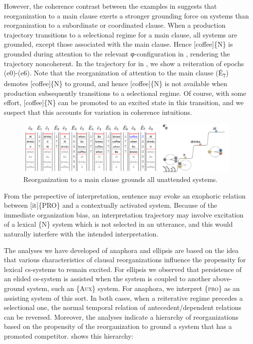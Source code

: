   However, the coherence contrast between the examples in  suggests that reorganization to a main clause exerts a stronger grounding force on systems than reorganization to a subordinate or coordinated clause. When a production trajectory transitions to a selectional regime for a main clause, all systems are grounded, except those associated with the main clause. Hence [coffee]\{N\} is grounded during attention to the relevant φ-configuration in , rendering the trajectory noncoherent. In the trajectory for  in {}, we show a reiteration of epochs (e0)-(e6). Note that the reorganization of attention to the main clause (Ê\textsubscript{7}) demotes [coffee]\{N\} to ground, and hence [coffee]\{N\} is not available when production subsequently transitions to a selectional regime. Of course, with some effort, [coffee]\{N\} can be promoted to an excited state in this transition, and we suspect that this accounts for variation in coherence intuitions. 

\ea\label{ex:7:2}
\z
\z
  
\begin{figure}
\includegraphics[width=\textwidth]{figures/Tilsen-img155.png}
\caption{Reorganization to a main clause grounds all unattended systems.}
\label{fig:7:11}
\end{figure}
 

  From the perspective of interpretation, sentence  may evoke an exophoric relation between [it]\{PRO\} and a contextually activated system. Because of the immediate organization bias, an interpretation trajectory may involve excitation of a lexical \{N\} system which is not selected in an utterance, and this would naturally interfere with the intended interpretation. 

  The analyses we have developed of anaphora and ellipsis are based on the idea that various characteristics of clausal reorganizations influence the propensity for lexical cs-systems to remain excited. For ellipsis we observed that persistence of an elided cs-system is assisted when the system is coupled to another above-ground system, such an \{A\textsc{ux}\} system. For anaphora, we interpret \{\textsc{pro}\} as an assisting system of this sort. In both cases, when a reiterative regime precedes a selectional one, the normal temporal relation of antecedent/dependent relations can be reversed. Moreover, the analyses indicate a hierarchy of reorganizations based on the propensity of the reorganization to ground a system that has a promoted competitor.  shows this hierarchy:

